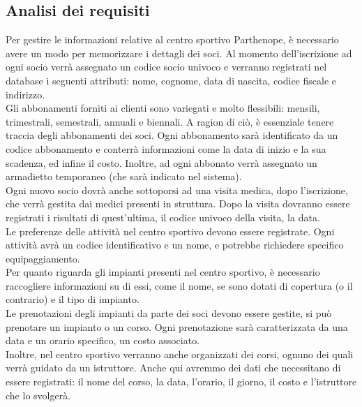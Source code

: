 \documentclass{article}
\begin{document}
\subsection{Analisi dei requisiti}
    \begin{flushleft}
        Per gestire le informazioni relative al centro sportivo Parthenope, è necessario avere un modo per memorizzare i dettagli dei soci. Al momento dell’iscrizione ad ogni socio verrà assegnato un codice socio univoco e verranno registrati nel database i seguenti attributi: nome, cognome, data di nascita, codice fiscale e indirizzo. \\
        \vspace{2mm}
        Gli abbonamenti forniti ai clienti sono variegati e molto flessibili: mensili, trimestrali, semestrali, annuali e biennali. A ragion di ciò, è essenziale tenere traccia degli abbonamenti dei soci. Ogni abbonamento sarà identificato da un codice abbonamento e conterrà informazioni come la data di inizio e la sua scadenza, ed infine il costo. Inoltre, ad ogni abbonato verrà assegnato un armadietto temporaneo (che sarà indicato nel sistema). \\
        \vspace{2mm}
        Ogni nuovo socio dovrà anche sottoporsi ad una visita medica, dopo l'iscrizione, che verrà gestita dai medici presenti in struttura. Dopo la visita dovranno essere registrati i risultati di quest'ultima, il codice univoco della visita, la data.\\
        \vspace{2mm}
        Le preferenze delle attività nel centro sportivo devono essere registrate. Ogni attività avrà un codice identificativo e un nome, e potrebbe richiedere specifico equipaggiamento. \\
        \vspace{2mm}
        Per quanto riguarda gli impianti presenti nel centro sportivo, è necessario raccogliere informazioni su di essi, come il nome, se sono dotati di copertura (o il contrario) e il tipo di impianto. \\
        \vspace{2mm}
        Le prenotazioni degli impianti da parte dei soci devono essere gestite, si può prenotare un impianto o un corso. Ogni prenotazione sarà caratterizzata da una data e un orario specifico, un costo associato. \\
        \vspace{2mm}
        Inoltre, nel centro sportivo verranno anche organizzati dei corsi, ognuno dei quali verrà guidato da un istruttore. Anche qui avremmo dei dati che necessitano di essere registrati: il nome del corso, la data, l'orario, il giorno, il costo e l'istruttore che lo svolgerà. \\

\end{flushleft}
\end{document}
